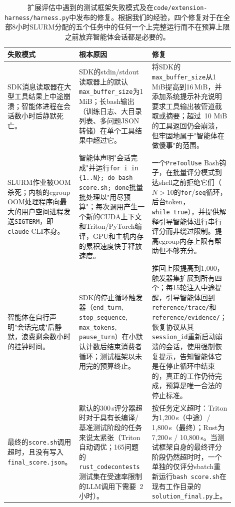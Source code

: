\documentclass[
]{article}
\theoremstyle{definition}
\begin{document}
\begin{table}[h]
\centering
\small
\begin{tabular}{p{0.22\linewidth} p{0.32\linewidth} p{0.36\linewidth}}
\toprule
\textbf{失败模式} & \textbf{根本原因} & \textbf{修复} \\
\midrule
SDK消息读取器在大型工具结果上中途崩溃；智能体进程在会话数小时后静默死亡。
& SDK的stdin/stdout读取器上的默认\texttt{max\_buffer\_size}为1\,MiB；长bash输出（训练日志、大目录列表、多问题JSON转储）在单个工具结果中超过它。
& 将SDK的\texttt{max\_buffer\_size}从1\,MiB提高到16\,MiB，并添加系统提示补充说明要求工具输出被管道截取或摘要；超过~10 MiB的工具返回仍会崩溃，但牢固地属于"智能体在做傻事"的范围。 \\
\addlinespace
SLURM作业被OOM杀死；内核的cgroup OOM处理程序向最大的用户空间进程发送\texttt{SIGTERM}，即\texttt{claude} CLI本身。
& 智能体声明"会话完成"并运行\texttt{for i in \{1..N\}; do bash score.sh; done}批量批处理以"用尽预算"；每次调用产生一个新的CUDA上下文和Triton/PyTorch编译，GPU和主机内存的累积速度快于释放速度。
& 一个\texttt{PreToolUse} Bash钩子，在批量评分模式到达shell之前拒绝它们（$N{>}10$的\texttt{for}/\texttt{seq}循环，后台token，\texttt{while~true}），并提供解释引导智能体进行串行评分而非绕过限制。提高cgroup内存上限有帮助但不够充分。 \\
\addlinespace
智能体在自行声明"会话完成"后静默，浪费剩余数小时的挂钟时间。
& SDK的停止循环触发器（\texttt{end\_turn}, \texttt{stop\_sequence}, \texttt{max\_tokens}, \texttt{pause\_turn}）在小默认计数后结束消费者循环；测试框架以未用完的预算终止。
& 推回上限提高到1{,}000，触发器集扩展到所有四个；每15轮注入中途提醒，引导智能体回到\texttt{reference/trace/}和\texttt{reference/evidence/}；恢复协议从其\texttt{session\_id}重新启动崩溃的会话，使用强制恢复提示，告知智能体它是在停止循环中结束的，真正的工作仍待完成，预算是唯一合法的停止标准。 \\
\addlinespace
最终的\texttt{score.sh}调用超时，且没有写入\texttt{final\_score.json}。
& 默认的300\,s评分器超时对于具有长编译/基准测试阶段的任务来说太紧张（Triton自动调优；165问题的\texttt{rust\_codecontests}测试集在受速率限制的LLM调用下需要~2 小时）。
& 按任务定义超时：Triton为1{,}200\,s（中途）/ 1{,}800\,s（最终）；Rust为7{,}200\,s / 10{,}800\,s。当测试框架自身的最终评分阶段仍然超时时，一个单独的仅评分sbatch重新运行\texttt{bash score.sh}在现有工作目录的\texttt{solution\_final.py}上。 \\
\bottomrule
\end{tabular}
\caption{扩展评估中遇到的测试框架失败模式及在\texttt{code/extension-harness/harness.py}中发布的修复。根据我们的经验，四个修复对于在全部8小时SLURM分配的五个任务中的任何一个上完整运行而不在预算上限之前放弃智能体会话都是必要的。}
\label{tab-harness-fixes}
\end{table}
\end{document}
